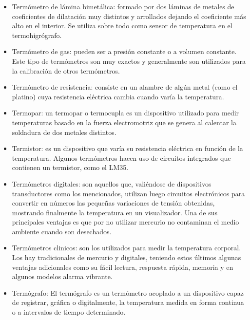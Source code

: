 \begin{itemize}
						\item Termómetro de lámina bimetálica: formado por dos láminas de metales de coeficientes de dilatación muy distintos y arrollados dejando el coeficiente más alto en el interior. Se utiliza sobre todo como sensor de temperatura en el termohigrógrafo.
						
						\item Termómetro de gas: pueden ser a presión constante o a volumen constante. Este tipo de termómetros son muy exactos y generalmente son utilizados para la calibración de otros termómetros.
						
						\item Termómetro de resistencia: consiste en un alambre de algún metal (como el platino) cuya resistencia eléctrica cambia cuando varía la temperatura.
						
						\item Termopar: un termopar o termocupla es un dispositivo utilizado para medir temperaturas basado en la fuerza electromotriz que se genera al calentar la soldadura de dos metales distintos.
						
						\item Termistor:  es un dispositivo que varía su resistencia eléctrica en función de la temperatura. Algunos termómetros hacen uso de circuitos integrados que contienen un termistor, como el LM35.
						
						\item Termómetros digitales: son aquellos que, valiéndose de dispositivos transductores como los mencionados, utilizan luego circuitos electrónicos para convertir en números las pequeñas variaciones de tensión obtenidas, mostrando finalmente la temperatura en un visualizador. Una de sus principales ventajas es que por no utilizar mercurio no contaminan el medio ambiente cuando son desechados.
						
						\item Termómetros clinicos: son los utilizados para medir la temperatura corporal. Los hay tradicionales de mercurio y digitales, teniendo estos últimos algunas ventajas adicionales como su fácil lectura, respuesta rápida, memoria y en algunos modelos alarma vibrante.
						
						\item Termógrafo: El termógrafo es un termómetro acoplado a un dispositivo capaz de registrar, gráfica o digitalmente, la temperatura medida en forma continua o a intervalos de tiempo determinado.
						
					\end{itemize}
		\newpage
		\thispagestyle{plain}
